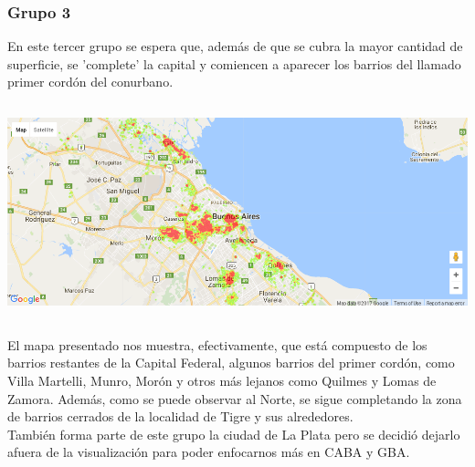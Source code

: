 \documentclass[a4paper, 10pt]{article}
\newcommand\tab[1][0.5cm]{\hspace*{#1}}
\begin{document}
				\subsubsection{Grupo 3}
					En este tercer grupo se espera que, además de que se cubra la mayor cantidad de superficie, se 'complete' la
					capital y comiencen a aparecer los barrios del llamado primer cordón del conurbano.
					\begin{center}
						\includegraphics[width=6in, height=2.46in]{images/m2Group3HeatMap}
				  	\end{center}
				  	\tab El mapa presentado nos muestra, efectivamente, que está compuesto de los barrios restantes de la Capital
				  	Federal, algunos barrios del primer cordón, como Villa Martelli, Munro, Morón y otros más lejanos como Quilmes y
				  	Lomas de Zamora. Además, como se puede observar al Norte, se sigue completando la zona de barrios cerrados de la
				  	localidad de Tigre y sus alrededores. \\
				  	\tab También forma parte de este grupo la ciudad de La Plata pero se decidió dejarlo afuera de la visualización
				  	para poder enfocarnos más en CABA y GBA.
\end{document}
